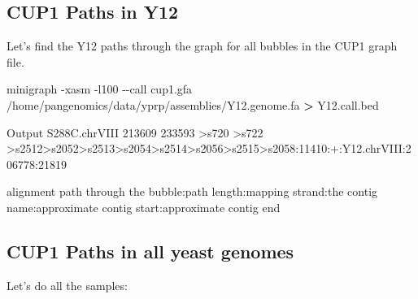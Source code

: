 \documentclass[
]{book}
\newenvironment{Shaded}{\begin{snugshade}}{\end{snugshade}}
\newcommand{\AttributeTok}[1]{\textcolor[rgb]{0.77,0.63,0.00}{#1}}
\newcommand{\ControlFlowTok}[1]{\textcolor[rgb]{0.13,0.29,0.53}{\textbf{#1}}}
\newcommand{\ExtensionTok}[1]{#1}
\newcommand{\FunctionTok}[1]{\textcolor[rgb]{0.00,0.00,0.00}{#1}}
\newcommand{\KeywordTok}[1]{\textcolor[rgb]{0.13,0.29,0.53}{\textbf{#1}}}
\newcommand{\NormalTok}[1]{#1}
\newcommand{\OperatorTok}[1]{\textcolor[rgb]{0.81,0.36,0.00}{\textbf{#1}}}
\newcommand{\PreprocessorTok}[1]{\textcolor[rgb]{0.56,0.35,0.01}{\textit{#1}}}
\newcommand{\VariableTok}[1]{\textcolor[rgb]{0.00,0.00,0.00}{#1}}
\begin{document}
\hypertarget{cup1-paths-in-y12}{%
\subsection*{CUP1 Paths in Y12}\label{cup1-paths-in-y12}}

Let's find the Y12 paths through the graph for all bubbles in the CUP1 graph file.

\begin{Shaded}
\begin{Highlighting}[]
\ExtensionTok{minigraph} \AttributeTok{{-}xasm} \AttributeTok{{-}l100} \AttributeTok{{-}{-}call}\NormalTok{ cup1.gfa /home/pangenomics/data/yprp/assemblies/Y12.genome.fa }\OperatorTok{\textgreater{}}\NormalTok{ Y12.call.bed}
\end{Highlighting}
\end{Shaded}

Output
S288C.chrVIII 213609 233593 \textgreater s720 \textgreater s722 \textgreater s2512\textgreater s2052\textgreater s2513\textgreater s2054\textgreater s2514\textgreater s2056\textgreater s2515\textgreater s2058:11410:+:Y12.chrVIII:206778:21819

alignment path through the bubble:path length:mapping strand:the contig name:approximate contig start:approximate contig end

\hypertarget{cup1-paths-in-all-yeast-genomes}{%
\subsection*{CUP1 Paths in all yeast genomes}\label{cup1-paths-in-all-yeast-genomes}}

Let's do all the samples:

\begin{Shaded}
\end{Shaded}
\end{document}

